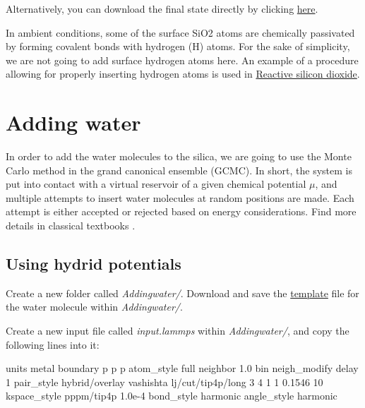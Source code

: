 \vspace{0.25cm} \noindent Alternatively, you can download the final state directly by clicking
\href{https://lammpstutorials.github.io/lammpstutorials-inputs/level3/water-adsorption-in-silica/Cracking/dilatedSiO.data}{here}.

\begin{tcolorbox}[colback=mylightblue!5!white,colframe=mylightblue!75!black,title=Passivated silica]

\vspace{0.25cm} \noindent In ambient conditions, some of the surface SiO2 atoms are chemically
passivated by forming covalent bonds with hydrogen (H)
atoms. For the sake of simplicity, we are not going to
add surface hydrogen atoms here. An example of a procedure allowing
for properly inserting hydrogen atoms is used
in \hyperref[reactive-silicon-dioxide-label]{Reactive silicon dioxide}.
\end{tcolorbox}

\noindent \section{Adding water}
In order to add the water molecules to the silica, we are
going to use the Monte Carlo method in the grand canonical
ensemble (GCMC). In short, the system is put into contact
with a virtual reservoir of a given chemical potential
$\mu$, and multiple attempts to insert water
molecules at random positions are made. Each attempt is
either accepted or rejected based on energy considerations. Find more details
in classical textbooks \cite{frenkel2023understanding}.

\subsection{Using hydrid potentials}
\noindent Create a new folder called \textit{Addingwater/}. Download and save the
\href{https://lammpstutorials.github.io/lammpstutorials-inputs/level3/water-adsorption-in-silica/AddingWater/H2O.mol}{template} file for the
water molecule within \textit{Addingwater/}.

\vspace{0.25cm} \noindent Create a new input file called \textit{input.lammps}
within \textit{Addingwater/}, and copy the
following lines into it:

\begin{lcverbatim}
units metal
boundary p p p
atom_style full
neighbor 1.0 bin
neigh_modify delay 1
pair_style hybrid/overlay vashishta lj/cut/tip4p/long 3 4 1 1 0.1546 10
kspace_style pppm/tip4p 1.0e-4
bond_style harmonic
angle_style harmonic
\end{lcverbatim}

